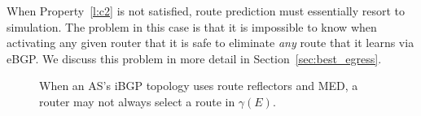 When Property~\ref{l:c2} is not satisfied, route prediction must
essentially resort to simulation.  The problem in this case is that it
is impossible to know when activating any given router that it is safe
to eliminate {\em any} route that it learns via eBGP.  We discuss this
problem in more detail in Section~\ref{sec:best_egress}.

\begin{figure}[t]
\begin{center}
\begin{psfrags}
\end{psfrags}
\end{center}
\caption{When an AS's iBGP topology uses route reflectors and MED, a
  router may not always select a route in $\gamma(E)$. }
\label{fig:ibgp2}
\end{figure}





